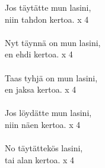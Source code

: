 
            Jos täytätte mun lasini, \\
            niin tahdon kertoa. x 4 \\
\hspace{10mm} \\
            Nyt täynnä on mun lasini, \\
            en ehdi kertoa. x 4 \\
\hspace{10mm} \\
            Taas tyhjä on mun lasini, \\
            en jaksa kertoa. x 4 \\
\hspace{10mm} \\
            Jos löydätte mun lasini, \\
            niin näen kertoa. x 4 \\
\hspace{10mm} \\
            No täytättekös lasini, \\
            tai alan kertoa. x 4 \\
